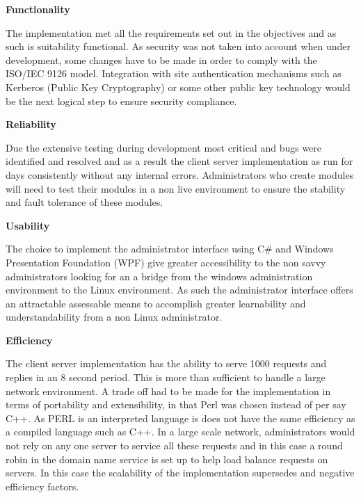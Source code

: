 \newpage	

	\large{\bfseries{Functionality}}
	\vspace{2mm}
	
	\normalsize
	{
		The implementation met all the requirements set out in the objectives and as such is suitability functional.
		As security was not taken into account when under development, some changes have to be made in order to 
		comply with the ISO/IEC 9126 model.  Integration with site authentication mechanisms such as Kerberos (Public Key Cryptography) or some other
		public key technology would be the next logical step to ensure security compliance.
		\newline	
	}				
	
	\large{\bfseries{Reliability}}	
	\vspace{2mm}

	\normalsize
	{
		Due the extensive testing during development most critical and bugs were identified and resolved and as a result
		the client server implementation as run for days consistently without any internal errors.
		Administrators who create modules will need to test their modules in a non live environment 
		to ensure the stability and fault tolerance of these modules.
		\newline	
	}				

	\large{\bfseries{Usability}}
	\vspace{2mm}

	\normalsize
	{
		The choice to implement the administrator interface using C\# and Windows Presentation Foundation (WPF)
		give greater accessibility to the non savvy administrators looking for an a bridge from the windows administration 
		environment to the Linux environment.  As such the administrator interface offers an attractable assessable means
		to accomplish greater learnability and understandability from a non Linux administrator.
		\newline	
	}

	\large{\bfseries{Efficiency}}
	\vspace{2mm}

	\normalsize
	{
		The client server implementation has the ability to serve 1000 requests and replies in an 8 second period.
		This is more than sufficient to handle a large network environment.  A trade off had to be made for the implementation
		in terms of portability and extensibility, in that Perl was chosen instead of per say C++.  
		As PERL is an interpreted language is does not have the same efficiency as a compiled language such as C++. 
		In a large scale network, administrators would not rely on any one server to service all these requests and in 
		this case a round robin in the domain name service is set up to help load balance requests on servers.
		In this case the scalability of the implementation supersedes and negative efficiency factors.
		\newline	
	}
	
